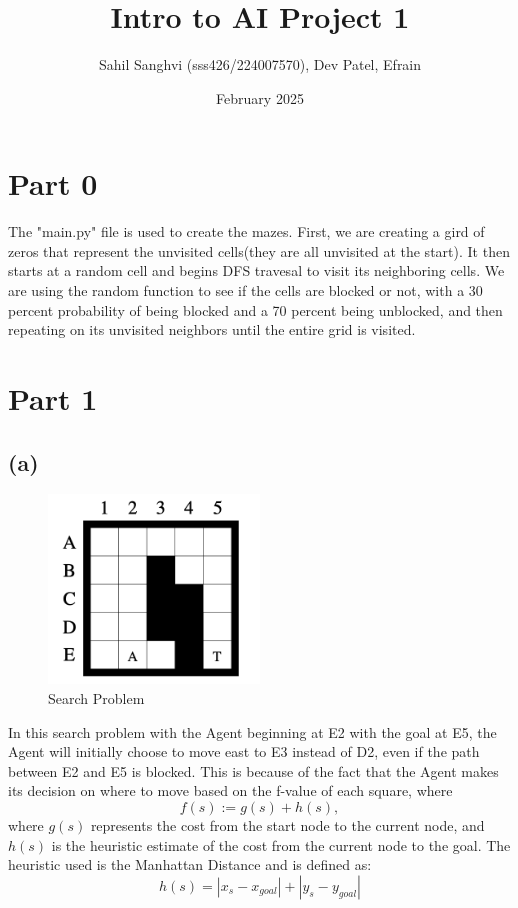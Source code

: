 \documentclass{article}
\title{Intro to AI Project 1}
\author{Sahil Sanghvi (sss426/224007570), Dev Patel, Efrain}
\date{February 2025}
\begin{document}
\maketitle

\section{Part 0}
The "main.py" file is used to create the mazes. First, we are creating a gird of zeros that represent the unvisited cells(they are all unvisited at the start). It then starts at a random cell and begins DFS travesal to visit its neighboring cells. We are using the random function to see if the cells are blocked or not, with a 30 percent probability of being blocked and a 70 percent being unblocked, and then repeating on its unvisited neighbors until the entire grid is visited. 


\section{Part 1}
\subsection*{(a)}
\begin{figure}[h]  %
    \centering
    \includegraphics[width=0.5\textwidth]{figure8.png}  %
    \caption{Search Problem}
    \label{fig:search_problem}
\end{figure}
In this search problem with the Agent beginning at E2 with the goal at E5, the Agent will initially choose to move east to E3 instead of D2, even if the path between E2 and E5 is blocked. 
This is because of the fact that the Agent makes its decision on where to move based on the f-value of each square, where 
\[f(s) := g(s) + h(s), \]
where \( g(s) \) represents the cost from the start node to the current node, and \( h(s) \) is the heuristic estimate of the cost from the current node to the goal. The heuristic used is the Manhattan Distance and is defined as:
\[h(s) = |x_s - x_{goal}| + |y_s - y_{goal}|\]
\end{document}
